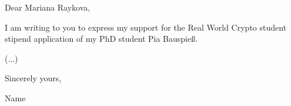 \documentclass{article}
\begin{document}
\bigskip

Dear Mariana Raykova,

\bigskip %


I am writing to you to express my support for the Real World Crypto student stipend application of my PhD student Pia Bauspieß.

(...)



\bigskip %

Sincerely yours,

\vspace{-10pt} %

\vspace{50pt} %

\vspace{-10pt} %
Name
\end{document}
